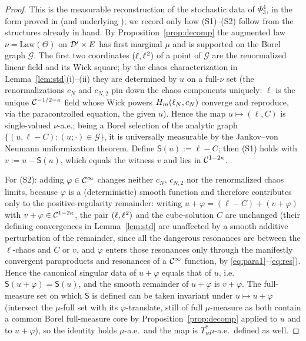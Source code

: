 \begin{proof}
This is the measurable reconstruction of the stochastic data of $\Phi^4_3$, in the
form proved in \cite{HKN24} (and underlying \cite{CC18,Hairer14}); we record only
how (S1)--(S2) follow from the structures already in hand. By
Proposition~\ref{prop:decomp} the augmented law $\nu=\mathrm{Law}(\Theta)$ on
$\mathcal{D}'\times E$ has first marginal $\mu$ and is supported on the Borel graph
$\mathcal G$. The first two coordinates $(\ell,\ell^{\hspace{0.5pt}2})$ of a point
of $\mathcal G$ are the renormalized linear field and its Wick square; by the
chaos characterization in Lemma~\ref{lem:std}(i)--(ii) they are determined by $u$
on a full-$\nu$ set (the renormalizations $c_N$ and $c_{N,2}$ pin down the chaos
components uniquely: $\ell$ is the unique $\mathcal{C}^{-1/2-\kappa}$ field whose Wick
powers $H_m(\ell_N,c_N)$ converge and reproduce, via the paracontrolled
equation, the given $u$). Hence the map
$u\mapsto(\ell,C)$ is single-valued $\nu$-a.e.; being a Borel selection of the
analytic graph $\{(u,\ell-C):(u;\cdot)\in\mathcal G\}$, it is universally
measurable by the Jankov--von Neumann uniformization theorem. Define
$\mathsf S(u):=\ell-C$; then (S1) holds with $v:=u-\mathsf S(u)$, which equals the
witness $v$ and lies in $\mathcal{C}^{1-2\kappa}$.

For (S2): adding $\varphi\in\mathcal{C}^\infty$ changes neither $c_N$, $c_{N,2}$ nor the
renormalized chaos limits, because $\varphi$ is a (deterministic) smooth function
and therefore contributes only to the positive-regularity remainder: writing
$u+\varphi=(\ell-C)+(v+\varphi)$ with $v+\varphi\in\mathcal{C}^{1-2\kappa}$, the pair
$(\ell,\ell^{\hspace{0.5pt}2})$ and the cube-solution $C$ are unchanged (their
defining convergences in Lemma~\ref{lem:std} are unaffected by a smooth additive
perturbation of the remainder, since all the dangerous resonances are between the
$\ell$-chaos and $C$ or $v$, and $\varphi$ enters those resonances only through
the manifestly convergent paraproducts and resonances of a $\mathcal{C}^\infty$ function,
by \eqref{eq:para1}--\eqref{eq:res}). Hence the canonical singular data of
$u+\varphi$ equals that of $u$, i.e.\ $\mathsf S(u+\varphi)=\mathsf S(u)$, and the
smooth remainder of $u+\varphi$ is $v+\varphi$. The full-measure set on which
$\mathsf S$ is defined can be taken invariant under $u\mapsto u+\varphi$ (intersect
the $\mu$-full set with its $\varphi$-translate, still of full $\mu$-measure as
both contain a common Borel full-measure core by Proposition~\ref{prop:decomp}
applied to $u$ and to $u+\varphi$), so the identity holds $\mu$-a.e.\ and the map
is $T_\psi^*\mu$-a.e.\ defined as well.
\end{proof}

